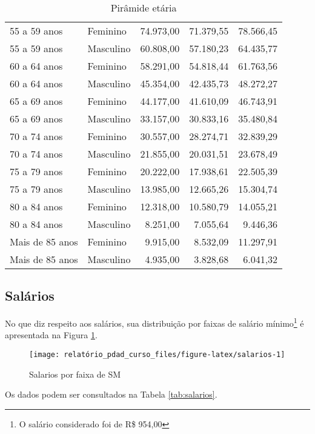 \documentclass[]{article}
\let\rmarkdownfootnote\footnote%
\def\footnote{\protect\rmarkdownfootnote}
\begin{document}
\begin{table}[!hb]
\begin{tabular}{llrrr}
  55 a 59 anos & Feminino & 74.973,00 & 71.379,55 & 78.566,45 \\ 
  55 a 59 anos & Masculino & 60.808,00 & 57.180,23 & 64.435,77 \\ 
  60 a 64 anos & Feminino & 58.291,00 & 54.818,44 & 61.763,56 \\ 
  60 a 64 anos & Masculino & 45.354,00 & 42.435,73 & 48.272,27 \\ 
  65 a 69 anos & Feminino & 44.177,00 & 41.610,09 & 46.743,91 \\ 
  65 a 69 anos & Masculino & 33.157,00 & 30.833,16 & 35.480,84 \\ 
  70 a 74 anos & Feminino & 30.557,00 & 28.274,71 & 32.839,29 \\ 
  70 a 74 anos & Masculino & 21.855,00 & 20.031,51 & 23.678,49 \\ 
  75 a 79 anos & Feminino & 20.222,00 & 17.938,61 & 22.505,39 \\ 
  75 a 79 anos & Masculino & 13.985,00 & 12.665,26 & 15.304,74 \\ 
  80 a 84 anos & Feminino & 12.318,00 & 10.580,79 & 14.055,21 \\ 
  80 a 84 anos & Masculino & 8.251,00 & 7.055,64 & 9.446,36 \\ 
  Mais de 85 anos & Feminino & 9.915,00 & 8.532,09 & 11.297,91 \\ 
  Mais de 85 anos & Masculino & 4.935,00 & 3.828,68 & 6.041,32 \\ 
   \hline
\end{tabular}
\caption{Pirâmide etária} 
\label{tab:piramide}
\end{table}

\clearpage

\subsection{Salários}\label{salarios}

No que diz respeito aos salários, sua distribuição por faixas de salário
mínimo\footnote{O salário considerado foi de R\$ 954,00} é apresentada
na Figura \ref{fig:salarios}.

\begin{figure}[H]
\texttt{[image: relatório\_pdad\_curso\_files/figure-latex/salarios-1]} \caption{Salarios por faixa de SM \label{fig:salarios}}\label{fig:salarios}
\end{figure}

Os dados podem ser consultados na Tabela \ref{tab:salarios}.
\end{document}
